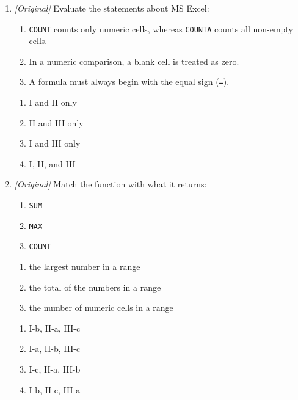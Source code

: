 \documentclass[11pt]{article}
\begin{document}
\begin{enumerate}[label=\textbf{Q\arabic*.}, leftmargin=*]
\begin{enumerate}[label=\Alph*.]
    \item \texttt{\#DIV/0!}
    \item \texttt{\#VALUE!}
    \item \texttt{\#NAME?}
    \item \texttt{\#TOTAL!}
  \end{enumerate}
\item \textit{[Original]} Evaluate the statements about MS Excel:
  \begin{enumerate}[label=\Roman*.]
    \item \texttt{COUNT} counts only numeric cells, whereas \texttt{COUNTA}
      counts all non-empty cells.
    \item In a numeric comparison, a blank cell is treated as zero.
    \item A formula must always begin with the equal sign (\texttt{=}).
  \end{enumerate}
  \begin{enumerate}[label=\Alph*.]
    \item I and II only
    \item II and III only
    \item I and III only
    \item I, II, and III
  \end{enumerate}
\item \textit{[Original]} Match the function with what it returns:
  \begin{enumerate}[label=\Roman*.]
    \item \texttt{SUM}
    \item \texttt{MAX}
    \item \texttt{COUNT}
  \end{enumerate}
  \begin{enumerate}[label=(\alph*)]
    \item the largest number in a range
    \item the total of the numbers in a range
    \item the number of numeric cells in a range
  \end{enumerate}
  \begin{enumerate}[label=\Alph*.]
    \item I-b, II-a, III-c
    \item I-a, II-b, III-c
    \item I-c, II-a, III-b
    \item I-b, II-c, III-a
  \end{enumerate}


\end{enumerate}
\end{document}
